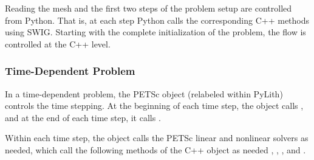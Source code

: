 Reading the mesh and the first two steps of the problem setup are
controlled from Python. That is, at each step Python calls the
corresponding C++ methods using SWIG. Starting with the complete
initialization of the problem, the flow is controlled at the C++
level.

\subsubsection{Time-Dependent Problem}

In a time-dependent problem, the PETSc  object (relabeled
 within PyLith) controls the time stepping. At the
beginning of each time step, the  object calls
, and at the end of each
time step, it calls .

Within each time step, the  object calls the PETSc
linear and nonlinear solvers as needed, which call the following
methods of the C++  object as
needed
,
,
, and
.


